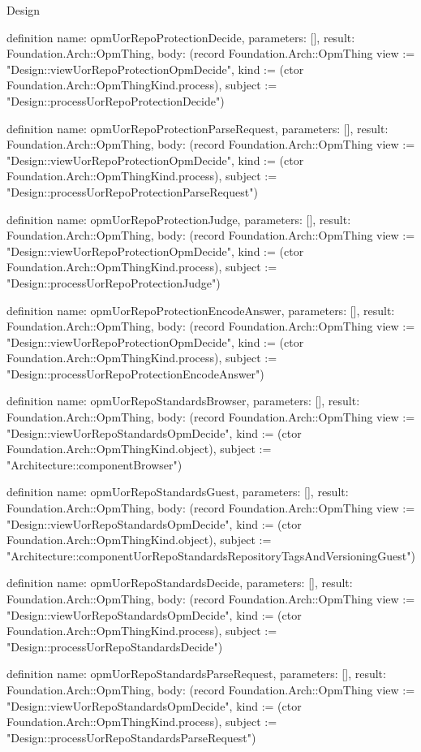 \begin{lexlean}{Design}
\begin{semanticmodule}
definition{
  name: opmUorRepoProtectionDecide,
  parameters: [],
  result: Foundation.Arch::OpmThing,
  body: (record Foundation.Arch::OpmThing {view := "Design::viewUorRepoProtectionOpmDecide", kind := (ctor Foundation.Arch::OpmThingKind.process), subject := "Design::processUorRepoProtectionDecide"})
}

definition{
  name: opmUorRepoProtectionParseRequest,
  parameters: [],
  result: Foundation.Arch::OpmThing,
  body: (record Foundation.Arch::OpmThing {view := "Design::viewUorRepoProtectionOpmDecide", kind := (ctor Foundation.Arch::OpmThingKind.process), subject := "Design::processUorRepoProtectionParseRequest"})
}

definition{
  name: opmUorRepoProtectionJudge,
  parameters: [],
  result: Foundation.Arch::OpmThing,
  body: (record Foundation.Arch::OpmThing {view := "Design::viewUorRepoProtectionOpmDecide", kind := (ctor Foundation.Arch::OpmThingKind.process), subject := "Design::processUorRepoProtectionJudge"})
}

definition{
  name: opmUorRepoProtectionEncodeAnswer,
  parameters: [],
  result: Foundation.Arch::OpmThing,
  body: (record Foundation.Arch::OpmThing {view := "Design::viewUorRepoProtectionOpmDecide", kind := (ctor Foundation.Arch::OpmThingKind.process), subject := "Design::processUorRepoProtectionEncodeAnswer"})
}

definition{
  name: opmUorRepoStandardsBrowser,
  parameters: [],
  result: Foundation.Arch::OpmThing,
  body: (record Foundation.Arch::OpmThing {view := "Design::viewUorRepoStandardsOpmDecide", kind := (ctor Foundation.Arch::OpmThingKind.object), subject := "Architecture::componentBrowser"})
}

definition{
  name: opmUorRepoStandardsGuest,
  parameters: [],
  result: Foundation.Arch::OpmThing,
  body: (record Foundation.Arch::OpmThing {view := "Design::viewUorRepoStandardsOpmDecide", kind := (ctor Foundation.Arch::OpmThingKind.object), subject := "Architecture::componentUorRepoStandardsRepositoryTagsAndVersioningGuest"})
}

definition{
  name: opmUorRepoStandardsDecide,
  parameters: [],
  result: Foundation.Arch::OpmThing,
  body: (record Foundation.Arch::OpmThing {view := "Design::viewUorRepoStandardsOpmDecide", kind := (ctor Foundation.Arch::OpmThingKind.process), subject := "Design::processUorRepoStandardsDecide"})
}

definition{
  name: opmUorRepoStandardsParseRequest,
  parameters: [],
  result: Foundation.Arch::OpmThing,
  body: (record Foundation.Arch::OpmThing {view := "Design::viewUorRepoStandardsOpmDecide", kind := (ctor Foundation.Arch::OpmThingKind.process), subject := "Design::processUorRepoStandardsParseRequest"})
}


\end{semanticmodule}
\end{lexlean}
